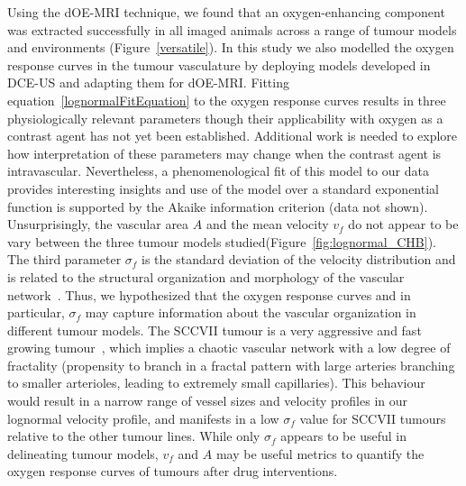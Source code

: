 Using the \acs{dOE-MRI} technique, we found that an oxygen-enhancing component was extracted successfully in all imaged animals across a range of tumour models and environments (Figure~\ref{versatile}).
In this study we also modelled the oxygen response curves in the tumour vasculature by deploying models developed in \acs{DCE-US} and adapting them for \acs{dOE-MRI}.
Fitting equation~\ref{lognormalFitEquation} to the oxygen response curves results in three physiologically relevant parameters though their applicability with oxygen as a contrast agent has not yet been established.
Additional work is needed to explore how interpretation of these parameters may change when the contrast agent is intravascular. 
Nevertheless, a phenomenological fit of this model to our data provides interesting insights and use of the model over a standard exponential function is supported by the Akaike information criterion (data not shown).
Unsurprisingly, the vascular area $A$ and the mean velocity $v_f$ do not appear to be vary between the three tumour models studied(Figure~\ref{fig:lognormal_CHB}).
The third parameter $\sigma_f$ is the standard deviation of the velocity distribution and is related to the structural organization and morphology of the vascular network~\cite{Hudson:2009jv}.
Thus, we hypothesized that the oxygen response curves and in particular, $\sigma_f$ may capture information about the vascular organization in different tumour models.
The SCCVII tumour is a very aggressive and fast growing tumour~\cite{Khurana:2001wb}, which implies a chaotic vascular network with a low degree of fractality (propensity to branch in a fractal pattern with large arteries branching to smaller arterioles, leading to extremely small capillaries).
This behaviour would result in a narrow range of vessel sizes and velocity profiles in our lognormal velocity profile,  and manifests in a low $\sigma_f$ value for SCCVII tumours relative to the other tumour lines.
While only $\sigma_f$ appears to be useful in delineating tumour models, $v_f$ and $A$ may be useful metrics to quantify the oxygen response curves of tumours after drug interventions. 
  
